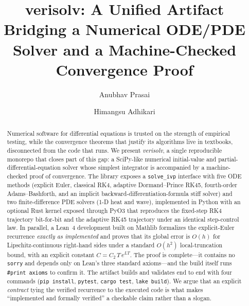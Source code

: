 \documentclass[sigplan,nonacm,screen]{acmart}
\begin{document}
\title{verisolv: A Unified Artifact Bridging a Numerical ODE/PDE Solver and a
Machine-Checked Convergence Proof}

\author{Anubhav Prasai}

\author{Himangsu Adhikari}

\begin{abstract}
Numerical software for differential equations is trusted on the strength of
empirical testing, while the convergence theorems that justify its algorithms
live in textbooks, disconnected from the code that runs. We present
\emph{verisolv}, a single reproducible monorepo that closes part of this gap: a
SciPy-like numerical initial-value and partial-differential-equation
solver whose simplest integrator is accompanied by a machine-checked proof of
convergence. The library exposes a \texttt{solve\_ivp} interface with five ODE
methods (explicit Euler, classical RK4, adaptive Dormand--Prince RK45,
fourth-order Adams--Bashforth, and an implicit backward-differentiation-formula
stiff solver) and two finite-difference PDE solvers (1-D heat and wave),
implemented in Python with an optional Rust kernel exposed through PyO3 that
reproduces the fixed-step RK4 trajectory bit-for-bit and the adaptive RK45
trajectory under an identical step-control law. In parallel, a Lean~4 development
built on Mathlib formalizes the explicit-Euler recurrence \emph{exactly as
implemented} and proves that its global error is $O(h)$ for Lipschitz-continuous
right-hand sides under a standard $O(h^2)$ local-truncation bound, with an
explicit constant $C = C_2\,T\,e^{LT}$. The proof is complete---it contains no
\texttt{sorry} and depends only on Lean's three standard axioms---and the build
itself runs \texttt{\#print axioms} to confirm it. The artifact builds and
validates end to end with four commands (\texttt{pip install}, \texttt{pytest},
\texttt{cargo test}, \texttt{lake build}). We argue that an explicit
\emph{contract} tying the verified recurrence to the executed code is what makes
``implemented and formally verified'' a checkable claim rather than a slogan.
\end{abstract}


\maketitle
\end{document}
